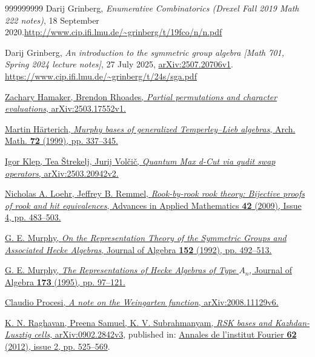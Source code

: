 \documentclass[numbers=enddot,12pt,final,onecolumn,notitlepage]{scrartcl}%
\numberwithin{exer}{subsection}
\theoremstyle{definition}
\begin{document}
\begin{thebibliography}{999999999}
Darij Grinberg, \textit{Enumerative Combinatorics
(Drexel Fall 2019 Math 222 notes)}, 18 September 2020.\newline\url{http://www.cip.ifi.lmu.de/~grinberg/t/19fco/n/n.pdf}

Darij Grinberg, \textit{An introduction to the
symmetric group algebra [Math 701, Spring 2024 lecture notes]}, 27 July 2025,
\href{https://arxiv.org/abs/2507.20706v1}{arXiv:2507.20706v1}. \newline\url{https://www.cip.ifi.lmu.de/~grinberg/t/24s/sga.pdf}

\href{https://arxiv.org/abs/2503.17552v1}{Zachary
Hamaker, Brendon Rhoades, \textit{Partial permutations and character
evaluations}, arXiv:2503.17552v1.}

%
\href{https://doi.org/10.1007/s000130050341}{Martin H\"{a}rterich,
\textit{Murphy bases of generalized Temperley--Lieb algebras}, Arch. Math.
\textbf{72} (1999), pp. 337--345.}

\href{https://arxiv.org/abs/2503.20942v2}{Igor
Klep, Tea \v{S}trekelj, Jurij Vol\v{c}i\v{c}, \textit{Quantum Max d-Cut via
qudit swap operators}, arXiv:2503.20942v2.}

%
\href{https://doi.org/10.1016/j.aam.2008.09.003}{Nicholas A. Loehr, Jeffrey B.
Remmel, \textit{Rook-by-rook rook theory: Bijective proofs of rook and hit
equivalences}, Advances in Applied Mathematics \textbf{42} (2009), Issue 4,
pp. 483--503.}

%
\href{https://doi.org/10.1016/0021-8693(92)90045-N}{G. E. Murphy, \textit{On
the Representation Theory of the Symmetric Groups and Associated Hecke
Algebras}, Journal of Algebra \textbf{152} (1992), pp. 492--513.}

\href{https://doi.org/10.1006/jabr.1995.1079}{G.
E. Murphy, \textit{The Representations of Hecke Algebras of Type }$A_{n}$,
Journal of Algebra \textbf{173} (1995), pp. 97--121.}

\href{https://arxiv.org/abs/2008.11129v6}{Claudio
Procesi, \textit{A note on the Weingarten function}, arXiv:2008.11129v6.}

\href{https://arxiv.org/abs/0902.2842v3}{K. N.
Raghavan, Preena Samuel, K. V. Subrahmanyam, \textit{RSK bases and
Kazhdan-Lusztig cells}, arXiv:0902.2842v3}, published in:
\href{https://eudml.org/doc/251104}{Annales de l'institut Fourier \textbf{62}
(2012), issue 2, pp. 525--569}.


\end{thebibliography}
\end{document}
